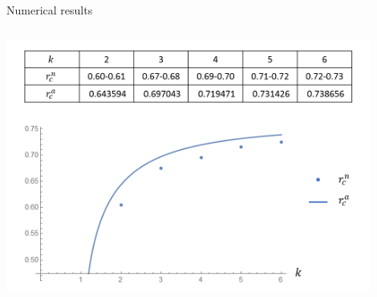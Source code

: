 \documentclass{fdubeamer}
\newcommand{\1}{\mathbb{1}}
\begin{document}
\begin{frame}{Numerical results}
\begin{columns}[T]
    \centering
    \includegraphics[width=0.9\textwidth]{images/holographic/a-k+1-coupling.png}

\end{columns}


\end{frame}
\end{document}
